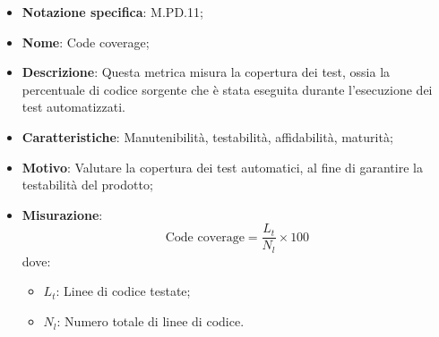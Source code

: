 \begin{itemize}
    \item \textbf{Notazione specifica}: M.PD.11;
    \item \textbf{Nome}: Code coverage;
    \item \textbf{Descrizione}: Questa metrica misura la copertura dei test, ossia la percentuale di codice sorgente che è stata eseguita durante l'esecuzione dei test automatizzati.
    \item \textbf{Caratteristiche}: Manutenibilità, testabilità, affidabilità, maturità;
    \item \textbf{Motivo}: Valutare la copertura dei test automatici, al fine di garantire la testabilità del prodotto;
    \item \textbf{Misurazione}: 
    \[
    \text{Code coverage} = \frac{L_{t}}{N_{l}} \times 100
    \]
    dove:
    \begin{itemize}
        \item $L_{t}$: Linee di codice testate;
        \item $N_{l}$: Numero totale di linee di codice.
    \end{itemize}
\end{itemize}
